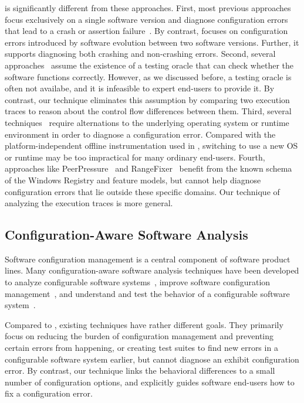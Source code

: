 \ourtool is significantly different from these approaches.
First, most previous approaches focus exclusively on a single software
version and diagnose configuration errors that lead to a crash or
assertion failure~\cite{Attariyan:2008:UCD, Whitaker:2004:CDS, 
Attariyan:2010:ACT, Rabkin:2011:PPC}. By contrast, \ourtool focuses
on configuration errors introduced by software evolution between
two software versions. Further, it supports diagnosing both
crashing and non-crashing errors.
Second, several approaches~\cite{Attariyan:2010:ACT, Whitaker:2004:CDS}
assume the existence of a testing oracle that can 
check whether the software functions correctly. However, as we discussed
before, a testing oracle is often not availabe, and it
is infeasible to expert end-users to provide it.
By contrast, our technique eliminates this assumption by
comparing two execution traces to reason about the control flow differences
between them. 
Third, several techniques~\cite{Whitaker:2004:CDS, Su:2007:AIC} require alternations
to the underlying operating system or runtime environment
in order to diagnose a configuration error. Compared with
the platform-independent offline instrumentation used
in \ourtool, switching to use a new OS or runtime may be
too impractical for many ordinary end-users.
Fourth, approaches like
PeerPressure~\cite{Wang:2004:AMT} and RangeFixer~\cite{rangefix}
benefit from the known schema of the Windows Registry and
feature models, but cannot help diagnose configuration errors
that lie outside these specific domains. Our technique
of analyzing the execution traces is more general.


\subsection{Configuration-Aware Software Analysis}

Software configuration management is a central component
of software product lines.
Many configuration-aware software analysis techniques
have been developed to analyze configurable software
systems~\cite{Bodden:2013:SLS, Kang:2005:FRL, Mende:2008:SGM,
Kruger:2005:SAE}, improve software configuration
management~\cite{Garvin:2011, Rabiser:2012:QSU, Cooray:2010:RRD,
Barreiros:2009:MRC, TerBeek:2011:GCE}, and understand and test
the behavior of a configurable software
system~\cite{Qu:2008:CRT, SPLAT, Apel:2009:FLA, Shang:2013:ADB,
Staats:2011:PTO}.

Compared to \ourtool, existing techniques have rather different
goals. They primarily focus on reducing the burden of
configuration management and preventing certain errors from
happening, or creating test suites to find new errors in
a configurable software system earlier, but cannot
diagnose an exhibit configuration error. By contrast, our \ourtool technique
links the behavioral differences to a small number
of configuration options, and explicitly guides software end-users
how to fix a configuration error.



